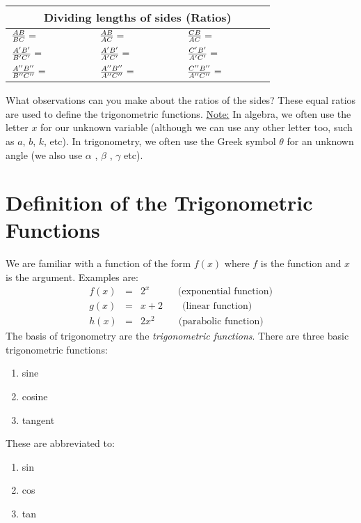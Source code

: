 \documentclass[10pt,a4paper,titlepage,twoside,openright]{report}
\begin{document}
{\begin{tabular}{|l|l|l|}
\hline
\multicolumn{3}{|c|}{Dividing lengths of sides (Ratios)} \\
\hline
$\frac{AB}{BC}=\hspace{15mm}$ & $\frac{AB}{AC}=\hspace{15mm}$ & $\frac{CB}{AC}=\hspace{15mm}$ \\
\hline
$\frac{A'B'}{B'C'}=\hspace{15mm}$ & $\frac{A'B'}{A'C'}=\hspace{15mm}$ & $\frac{C'B'}{A'C'}=\hspace{15mm}$ \\
\hline
$\frac{A''B''}{B''C''}=\hspace{15mm}$ & $\frac{A''B''}{A''C''}=\hspace{15mm} $ & $\frac{C''B''}{A''C''}=\hspace{15mm}$ \\
\hline
\end{tabular} \newline
\newline What observations can you make about the ratios of the sides? \newline
These equal ratios are used to define the trigonometric functions. \newline
\newline \underline{Note:} In algebra, we often use the letter $x$ for our unknown variable (although we can use any other letter too, such as $a$, $b$, $k$, etc). In trigonometry, we often use the Greek symbol $\theta$ for an unknown angle (we also use $\alpha$ , $\beta$ ,  $\gamma$ etc).}




\section{Definition of the Trigonometric Functions}
\label{trig:basics}
We are familiar with a function of the form $f(x)$ where $f$ is the function and $x$ is the argument. Examples are:
\begin{eqnarray*}
f(x)&=&2^x \qquad \ \ \ \ \text{(exponential function)}\\
g(x)&=&x+2 \qquad \text{(linear function)}\\
h(x)&=&2x^2 \qquad \ \ \text{(parabolic function)}
\end{eqnarray*}
The basis of trigonometry are the \textit{trigonometric functions}. There are three basic trigonometric functions:
\begin{enumerate}
\item{sine}
\item{cosine}
\item{tangent}
\end{enumerate}
These are abbreviated to:
\begin{enumerate}
\item{sin}
\item{cos}
\item{tan}
\end{enumerate}
\end{document}
